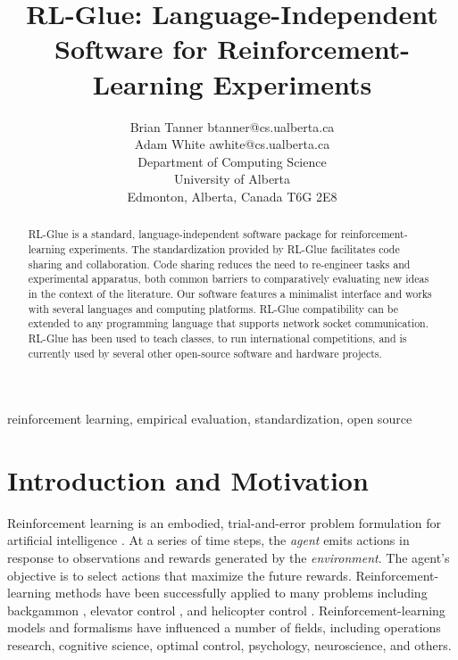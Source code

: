 \documentclass[twoside,11pt]{article}
\begin{document}
\title{RL-Glue: Language-Independent Software for Reinforcement-Learning Experiments}


\author{\name Brian Tanner \email btanner@cs.ualberta.ca \\
        \name Adam White  \email awhite@cs.ualberta.ca \\
       \addr Department of Computing Science \\
             University of Alberta \\
             Edmonton, Alberta, Canada T6G 2E8}


\maketitle

\begin{abstract}%
RL-Glue is a standard, language-independent software package for reinforcement-learning experiments.  The standardization provided by RL-Glue facilitates code sharing and collaboration.  Code sharing reduces the need to re-engineer tasks and experimental apparatus, both common barriers to comparatively evaluating new ideas in the context of the literature.  Our software features a minimalist interface and works with several languages and computing platforms. RL-Glue compatibility can be extended to any programming language that supports network socket communication. RL-Glue has been used to teach classes, to run international competitions, and is currently used by several other open-source software and hardware projects.
\end{abstract}

\begin{keywords}
reinforcement learning, empirical evaluation, standardization, open source
\end{keywords}

\section{Introduction and Motivation}
Reinforcement learning is an embodied, trial-and-error problem formulation for artificial intelligence \citep{rlbook, rlsurvey,ndp}.  At a series of time steps, the {\it agent} emits actions in response to observations and rewards generated by the {\it environment}.  The agent's objective is to select actions that maximize the future rewards.  Reinforcement-learning methods have been successfully applied to many problems including backgammon \citep{tesauro:nc94}, elevator control \citep{crites:mlj98}, and helicopter control \citep{ng:iser04}.  
Reinforcement-learning models and formalisms have influenced a number of fields, including operations research, cognitive science, optimal control, psychology, neuroscience, and others.
\end{document}
